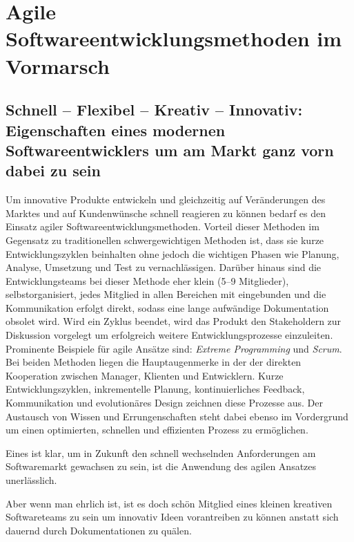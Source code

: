 \documentclass[%
paper=a4,                       %
fontsize=11pt,                  %
DIV=calc,                       %
parskip=half,                   %
headings=big,               %
bibliography=totoc,             %
]
{scrartcl}
\begin{document}
 

\section*{Agile Softwareentwicklungsmethoden im Vormarsch}

\subsection*{Schnell -- Flexibel -- Kreativ -- Innovativ:  Eigenschaften eines
modernen Softwareentwicklers um am Markt ganz vorn dabei zu sein}

Um innovative Produkte entwickeln und gleichzeitig auf Veränderungen des
Marktes und auf Kundenwünsche schnell reagieren zu können bedarf es den
Einsatz agiler Softwareentwicklungsmethoden. Vorteil dieser Methoden im
Gegensatz zu traditionellen schwergewichtigen Methoden ist, dass sie kurze
Entwicklungszyklen beinhalten ohne jedoch die wichtigen Phasen wie Planung,
Analyse, Umsetzung und Test zu vernachlässigen. Darüber hinaus sind die
Entwicklungsteams bei dieser Methode eher klein (5--9 Mitglieder),
selbstorganisiert, jedes Mitglied in allen Bereichen mit eingebunden und die
Kommunikation erfolgt direkt, sodass eine lange aufwändige Dokumentation
obsolet wird. Wird ein Zyklus beendet, wird das Produkt den Stakeholdern zur
Diskussion vorgelegt um erfolgreich weitere Entwicklungsprozesse einzuleiten.
Prominente Beispiele für agile Ansätze sind: \emph{Extreme Programming} und
\emph{Scrum}. Bei beiden Methoden liegen die Hauptaugenmerke in der der
direkten Kooperation zwischen Manager, Klienten und Entwicklern. Kurze
Entwicklungszyklen, inkrementelle Planung, kontinuierliches Feedback,
Kommunikation und evolutionäres Design zeichnen diese Prozesse aus. Der
Austausch von Wissen und Errungenschaften steht dabei ebenso im Vordergrund um
einen optimierten, schnellen und effizienten Prozess zu ermöglichen.

Eines ist klar, um in Zukunft den schnell wechselnden Anforderungen am
Softwaremarkt gewachsen zu sein, ist die Anwendung des agilen Ansatzes
unerlässlich.

Aber wenn man ehrlich ist, ist es doch schön Mitglied eines kleinen kreativen
Softwareteams zu sein um innovativ Ideen vorantreiben zu können anstatt sich
dauernd durch Dokumentationen zu quälen.
\end{document}
